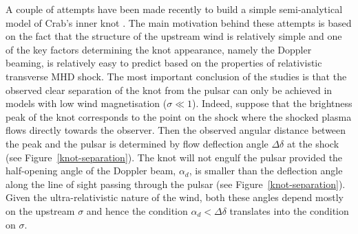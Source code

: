 A couple of attempts have been made recently to build a simple semi-analytical model of Crab’s inner knot \citep{YB-15,LKP-16}. The main motivation behind these attempts is based on the fact that the structure of the upstream wind is relatively simple and one of the key factors determining the knot appearance, namely the Doppler beaming, is relatively easy to predict based on the properties of relativistic transverse MHD shock.  The most important conclusion of the studies is that the observed clear separation of the knot from the pulsar can only be achieved in models with low wind magnetisation ($\sigma \ll 1$).  Indeed, suppose that the brightness peak of the knot corresponds to the point on the shock where the shocked plasma flows directly towards the observer. Then the observed angular distance between the peak and the pulsar is determined by flow deflection angle $\Delta\delta$ at the shock (see Figure~\ref{knot-separation}). The knot will not engulf the pulsar provided the half-opening angle of the Doppler beam, $\alpha_d$, is smaller than the deflection angle along the line of sight passing through the pulsar (see Figure~\ref{knot-separation}). Given the ultra-relativistic nature of the wind, both these angles depend mostly on the upstream $\sigma$ and hence the condition $\alpha_d < \Delta\delta$ translates into the condition on $\sigma$.    